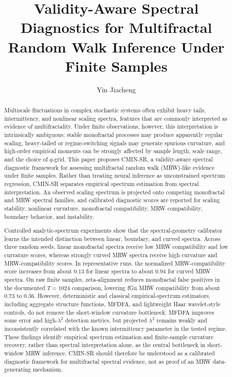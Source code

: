 \documentclass[11pt]{article}
\title{Validity-Aware Spectral Diagnostics for Multifractal Random Walk Inference Under Finite Samples}
\author{Yin Jiacheng}
\date{}
\begin{document}
\maketitle

\begin{abstract}
Multiscale fluctuations in complex stochastic systems often exhibit heavy
tails, intermittency, and nonlinear scaling spectra, features that are commonly
interpreted as evidence of multifractality. Under finite observations, however,
this interpretation is intrinsically ambiguous: stable monofractal processes
may produce apparently regular scaling, heavy-tailed or regime-switching
signals may generate spurious curvature, and high-order empirical moments can
be strongly affected by sample length, scale range, and the choice of
\(q\)-grid. This paper proposes CMIN-SR, a validity-aware spectral diagnostic
framework for assessing multifractal random walk (MRW)-like evidence under
finite samples. Rather than treating neural inference as unconstrained spectrum
regression, CMIN-SR separates empirical spectrum estimation from spectral
interpretation. An observed scaling spectrum is projected onto competing
monofractal and MRW spectral families, and calibrated diagnostic scores are
reported for scaling stability, nonlinear curvature, monofractal
compatibility, MRW compatibility, boundary behavior, and instability.

Controlled analytic-spectrum experiments show that the spectral-geometry
calibrator learns the intended distinction between linear, boundary, and
curved spectra. Across three random seeds, linear monofractal spectra receive
low MRW compatibility and low curvature scores, whereas strongly curved MRW
spectra receive high curvature and MRW-compatibility scores. In representative
runs, the normalized MRW-compatibility score increases from about \(0.13\) for
linear spectra to about \(0.94\) for curved MRW spectra. On raw finite samples,
zeta-alignment reduces monofractal false positives in the documented
\(T=1024\) comparison, lowering fGn MRW compatibility from about \(0.73\) to
\(0.36\). However, deterministic and classical empirical-spectrum estimators,
including aggregate structure functions, MFDFA, and lightweight Haar
wavelet-style controls, do not remove the short-window curvature bottleneck:
MFDFA improves some error and high-\(\lambda^2\) detection metrics, but
projected \(\lambda^2\) remains weakly and inconsistently correlated with the
known intermittency parameter in the tested regime. These findings identify
empirical spectrum estimation and finite-sample curvature recovery, rather
than spectral interpretation alone, as the central bottleneck in short-window
MRW inference. CMIN-SR should therefore be understood as a calibrated
diagnostic framework for multifractal spectral evidence, not as proof of an
MRW data-generating mechanism.
\end{abstract}
\end{document}
